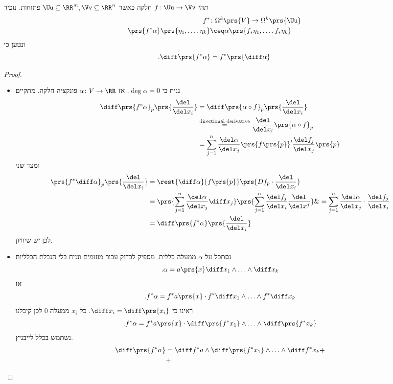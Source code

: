 \documentclass[a4paper,10pt,twoside,openany]{book}
\begin{document}
\begin{proposition}
תהי
$f \colon \Uu \to \Vv$
חלקה
כאשר
$\Uu \subseteq \RR^m, \Vv \subseteq \RR^n$
פתוחות.
נזכיר
\begin{align*}
f^* &\colon \Omega^k \prs{V} \to \Omega^k \prs{\Uu} \\
\prs{f^* \alpha}\prs{\eta_1, \ldots, \eta_k} &\ceq \alpha\prs{f_* \eta_1, \ldots, f_* \eta_k}
\end{align*}
ונטען כי
\[\text{.}\diff \prs{f^* \alpha} = f^* \prs{\diff \alpha}\]
\end{proposition}

\begin{proof}
\begin{itemize}
\item נניח כי
$\deg \alpha = 0$.
אז
$\alpha \colon V \to \RR$
פונקציה חלקה.
מתקיים
\begin{align*}
\diff\prs{f^* \alpha}_p \prs{\frac{\del}{\del x_i}} &= \diff \prs{\alpha \circ f}_p \prs{\frac{\del}{\del x_i}} \\& \stackrel{\text{directional derivative}}{=} \frac{\del}{\del x_i} \prs{\alpha \circ f}_p \\&= \sum_{j=1}^n \frac{\del \alpha}{\del x_j} \prs{f\prs{p}}' \frac{\del f_j}{\del x_j} \prs{p}
\end{align*}
ומצד שני
\begin{align*}
\prs{f^* \diff \alpha}_p \prs{\frac{\del}{\del x_i}} &= \rest{\diff \alpha}{f\prs{p}} \prs{D f_p \cdot \frac{\del}{\del x_i}} \\ &= \prs{\sum_{j=1}^n \frac{\del \alpha}{\del x_j} \diff x_j} \prs{\sum_{j=1}^n \frac{\del f_j}{\del x_i} \frac{\del}{\del x^j}} \&= \sum_{j=1}^n \frac{\del \alpha}{\del x_j} \cdot \frac{\del f_j}{\del x_i} \\&= \diff \prs{f^* \alpha}\prs{\frac{\del}{\del x_i}} 
\end{align*}
לכן יש שיוויון.
\item נסתכל על
$\alpha$
ממעלה כללית. מספיק לבדוק עבור מונומים ונניח בלי הגבלת הכלליות
\[\text{.} \alpha = a\prs{x} \diff x_1 \wedge \ldots \wedge \diff x_k\]
אז
\[\text{.} f^* \alpha = f^* a\prs{x} \cdot f^* \diff x_1 \wedge \ldots \wedge f^* \diff x_k\]
ראינו כי
$\diff x_i = \diff \prs{x_i}$.
כל
$x_i$
ממעלה
$0$
לכן קיבלנו
\[\text{.} f^* \alpha = f^* a\prs{x} \cdot \diff\prs{f^* x_1} \wedge \ldots \wedge \diff\prs{f^* x_k}\]
נשתמש בכלל לייבניץ.
\begin{align*}
\diff\prs{f^*  \alpha} &= \diff f^* a \wedge \diff\prs{f^* x_1} \wedge \ldots \wedge \diff f^* x_k +\\&+

\end{align*}
\end{itemize}
\end{proof}
\end{document}
